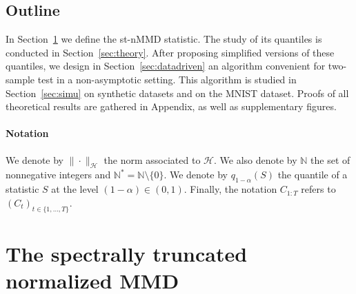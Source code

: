 \documentclass[twoside,11pt]{article}
\newcommand{\Hk}{\mathcal{H}}
\newcommand{\trueq}[1]{q_{1-\alpha}(#1) }
\begin{document}
\subsection{Outline} 
In Section~\ref{sec:regul_norm_MMD} we define the st-nMMD statistic. The study of its quantiles is conducted in Section~\ref{sec:theory}. After proposing simplified versions of these quantiles, we design in Section~\ref{sec:datadriven} an algorithm convenient for two-sample test in a non-asymptotic setting. This algorithm is studied in Section~\ref{sec:simu} on synthetic datasets and on the MNIST dataset. Proofs of all theoretical results are gathered in Appendix, as well as supplementary figures.

\paragraph{Notation}
We denote by $\| \cdot \|_{\Hk}$ the norm associated to $\Hk$. We also denote by ${\mathbb N}$ the set of nonnegative integers and ${\mathbb N}^*={\mathbb N}\setminus \{0\}$.
We denote by $\trueq{S}$  the  quantile of a statistic $S$ at the level $(1-\alpha) \in (0,1)$. Finally, the notation $C_{1:T}$ refers to $\left(C_t\right)_{t \in \{1,\ldots,T\}}$.
\section{The spectrally truncated normalized MMD}\label{sec:regul_norm_MMD}
\end{document}
